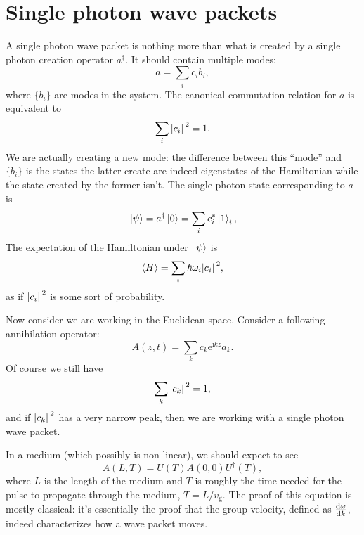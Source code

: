 \documentclass[hyperref, a4paper]{article}
\newcommand*{\ii}{\mathrm{i}}
\newcommand*{\ee}{\mathrm{e}}
\begin{document}
\section{Single photon wave packets}

A single photon wave packet is nothing more than what is created by a single photon creation operator $a^\dag$.
It should contain multiple modes:
\begin{equation}
    a = \sum_{i} c_i b_i,
\end{equation} 
where $\{b_i\}$ are modes in the system.
The canonical commutation relation for $a$ is equivalent to 
\begin{equation}
    \sum_i \abs*{c_i}^2 = 1.
\end{equation}
We are actually creating a new mode:
the difference between this ``mode'' and $\{b_i\}$ is 
the states the latter create are indeed eigenstates of the Hamiltonian
while the state created by the former isn't.
The single-photon state corresponding to $a$ is 
\begin{equation}
    \ket*{\psi} = a^\dag \ket*{0} = \sum_i c_i^* \ket*{1}_i,
\end{equation}
The expectation of the Hamiltonian under $\ket*{\psi}$ is 
\begin{equation}
    \expval{H} = \sum_i \hbar \omega_i \abs*{c_i}^2,
\end{equation} 
as if $\abs*{c_i}^2$ is some sort of probability. 

Now consider we are working in the Euclidean space.
Consider a following annihilation operator:
\begin{equation}
    A(z, t) = \sum_k c_k \ee^{\ii k z} a_k.
\end{equation}
Of course we still have 
\begin{equation}
    \sum_k \abs*{c_k}^2 = 1,
\end{equation}
and if $\abs*{c_k}^2$ has a very narrow peak,
then we are working with a single photon wave packet. 

In a medium (which possibly is non-linear),
we should expect to see 
\begin{equation}
    A(L, T) = U(T) A(0, 0) U^\dag(T),
\end{equation}
where $L$ is the length of the medium 
and $T$ is roughly the time needed for the pulse to propagate through the medium,
$T = L / v_{\text{g}}$.
The proof of this equation is mostly classical:
it's essentially the proof that the group velocity, defined as $\dv{\omega}{k}$,
indeed characterizes how a wave packet moves.
\end{document}

